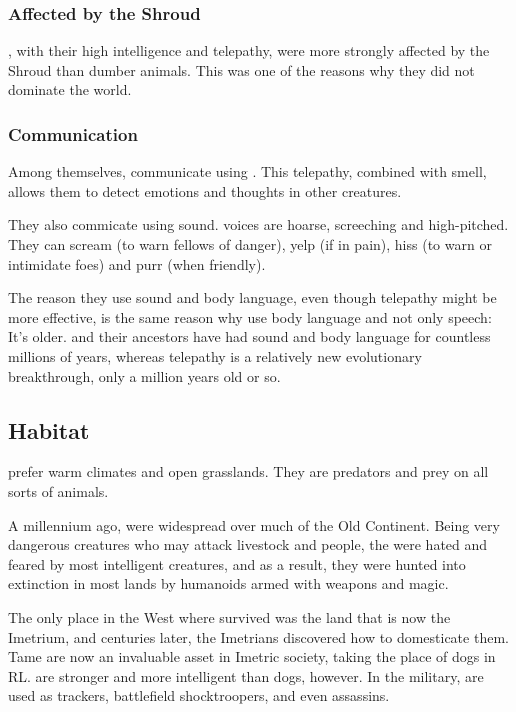\subsubsection{Affected by the Shroud}
\Nycans, with their high intelligence and telepathy, were more strongly affected by the Shroud than dumber animals. 
This was one of the reasons why they did not dominate the world. 





\subsubsection{Communication}
Among themselves, \nycans{} communicate using . 
This telepathy, combined with smell, allows them to detect emotions and thoughts in other creatures. 

They also commicate using sound. \Nycan{} voices are hoarse, screeching and high-pitched. They can scream (to warn fellows of danger), yelp (if in pain), hiss (to warn or intimidate foes) and purr (when friendly). 

The reason they use sound and body language, even though telepathy might be more effective, is the same reason why \humans{} use body language and not only speech: 
It's older. 
\Nycans{} and their ancestors have had sound and body language for countless millions of years, whereas telepathy is a relatively new evolutionary breakthrough, only a million years old or so. 









\subsection{Habitat}
\Nycans{} prefer warm climates and open grasslands. They are predators and prey on all sorts of animals. 

A millennium ago, \nycans{} were widespread over much of the Old Continent. Being very dangerous creatures who may attack livestock and people, the \nycans{} were hated and feared by most intelligent creatures, and as a result, they were hunted into extinction in most lands by humanoids armed with weapons and magic. 

The only place in the West where \nycans{} survived was the land that is now the Imetrium, and centuries later, the Imetrians discovered how to domesticate them. Tame \nycans{} are now an invaluable asset in Imetric society, taking the place of dogs in RL. \Nycans{} are stronger and more intelligent than dogs, however. In the military, \nycans{} are used as trackers, battlefield shocktroopers, and even assassins. 









